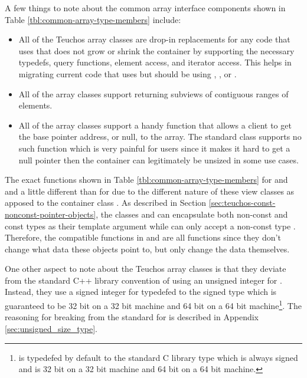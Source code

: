 \documentclass[pdf,ps2pdf,11pt]{SANDreport}
\begin{document}
A few things to note about the common array interface components shown in
Table {}\ref{tbl:common-array-type-members} include:

\begin{itemize}

{}\item{}All of the Teuchos array classes are drop-in replacements for any
code that uses {} that does not grow or shrink the container
by supporting the necessary typedefs, query functions, element access, and
iterator access.  This helps in migrating current code that uses
{} but should be using {}, {},
{} or {}.

{}\item{}All of the array classes support returning  subviews
of contiguous ranges of elements.

{}\item{}All of the array classes support a handy {} function
that allows a client to get the base pointer address, or null, to the array.
The standard {} class supports no such function which is very
painful for users since it makes it hard to get a null pointer then the
container can legitimately be unsized in some use cases.

\end{itemize}

The exact functions shown in Table {}\ref{tbl:common-array-type-members} for
{} and {} and a little different than for
{} due to the different nature of these view classes as apposed to
the container class {}.  As described in Section
{}\ref{sec:teuchos-const-nonconst-pointer-objects}, the classes
{} and {} can encapsulate both non-const and
const types {} as their template argument while {} can only
accept a non-const type {}.  Therefore, the {}
compatible functions in {} and {} are all
{} functions since they don't change what data these objects point
to, but only change the data themselves.

One other aspect to note about the Teuchos array classes is that they deviate
from the standard C++ library convention of using an unsigned integer for
{}.  Instead, they use a signed integer for {}
typedefed to the signed type {} which is guaranteed to
be 32 bit on a 32 bit machine and 64 bit on a 64 bit
machine\footnote{{} is typedefed by default to the
standard C library type {} which is always signed and is 32
bit on a 32 bit machine and 64 bit on a 64 bit machine.}.  The reasoning for
breaking from the {} standard for {} is
described in Appendix {}\ref{sec:unsigned_size_type}.
\end{document}
